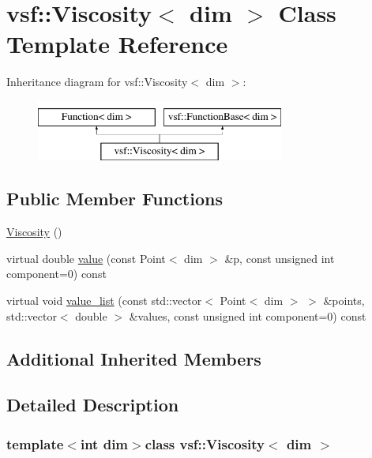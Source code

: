 \hypertarget{classvsf_1_1Viscosity}{\section{vsf\-:\-:Viscosity$<$ dim $>$ Class Template Reference}
\label{classvsf_1_1Viscosity}
}
Inheritance diagram for vsf\-:\-:Viscosity$<$ dim $>$\-:\begin{figure}[H]
\begin{center}
\leavevmode
\includegraphics[height=2.000000cm]{classvsf_1_1Viscosity}
\end{center}
\end{figure}
\subsection*{Public Member Functions}
\begin{DoxyCompactItemize}
\item 
\hyperlink{classvsf_1_1Viscosity_a679e1dadfa6b003cc17f8fe9fa2bdadc}{Viscosity} ()
\item 
virtual double \hyperlink{classvsf_1_1Viscosity_adf3ee3f49d4d9695adae1f56efa69411}{value} (const Point$<$ dim $>$ \&p, const unsigned int component=0) const 
\item 
virtual void \hyperlink{classvsf_1_1Viscosity_a59d7fac27c14d4145634ed84d6ea40ee}{value\-\_\-list} (const std\-::vector$<$ Point$<$ dim $>$ $>$ \&points, std\-::vector$<$ double $>$ \&values, const unsigned int component=0) const 
\end{DoxyCompactItemize}
\subsection*{Additional Inherited Members}


\subsection{Detailed Description}
\subsubsection*{template$<$int dim$>$class vsf\-::\-Viscosity$<$ dim $>$}

